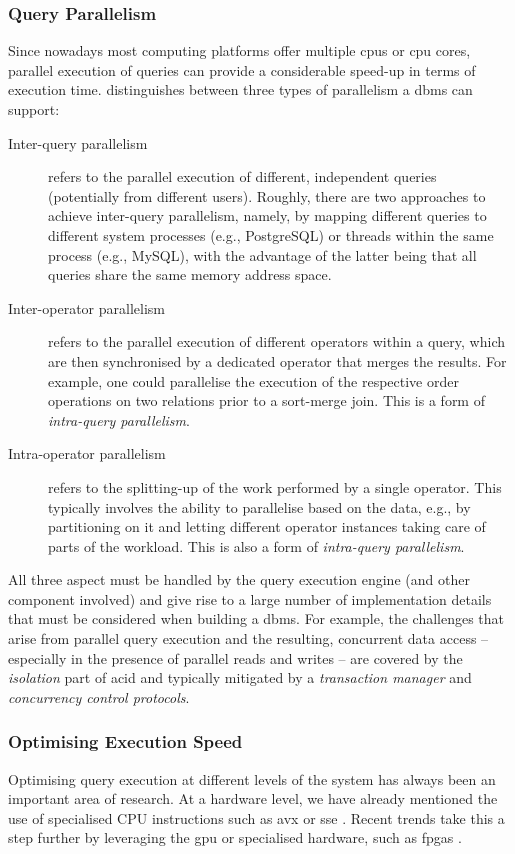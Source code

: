 \subsubsection{Query Parallelism}

Since nowadays most computing platforms offer multiple \acrshort{cpu}s or \acrshort{cpu} cores, parallel execution of queries can provide a considerable speed-up in terms of execution time. \cite{Graefe:1993Query} distinguishes between three types of parallelism a \acrshort{dbms} can support:

\begin{description}
    \item[Inter-query parallelism] refers to the parallel execution of different, independent queries (potentially from different users). Roughly, there are two approaches to achieve inter-query parallelism, namely, by mapping different queries to different system processes (e.g., PostgreSQL) or threads within the same process (e.g., MySQL), with the advantage of the latter being that all queries share the same memory address space.
    \item[Inter-operator parallelism] refers to the parallel execution of different operators within a query, which are then synchronised by a dedicated operator that merges the results. For example, one could parallelise the execution of the respective order operations on two relations prior to a sort-merge join. This is a form of \emph{intra-query parallelism}.
    \item[Intra-operator parallelism] refers to the splitting-up of the work performed by a single operator. This typically involves the ability to parallelise based on the data, e.g., by partitioning on it and letting different operator instances taking care of parts of the workload. This is also a form of \emph{intra-query parallelism}.
\end{description}

All three aspect must be handled by the query execution engine (and other component involved) and give rise to a large number of implementation details that must be considered when building a \acrshort{dbms}. For example, the challenges that arise from parallel query execution and the resulting, concurrent data access -- especially in the presence of parallel reads and writes -- are covered by the \emph{isolation} part of \acrshort{acid} and typically mitigated by a \emph{transaction manager} and \emph{concurrency control protocols}.

\subsubsection{Optimising Execution Speed}
Optimising query execution at different levels of the system has always been an important area of research. At a hardware level, we have already mentioned the use of specialised CPU instructions such as \acrshort{avx} or \acrshort{sse} \cite{Idreos:2012MonetDB,Polychroniou:2020VIP,Polychroniou:2019Towards,Shen:2021Using}. Recent trends take this a step further by leveraging the \acrshort{gpu} or specialised hardware, such as \acrshort{fpga}s \cite{Abadi:2014Beckman,Abadi:2020Seattle,Paul:2021Database}.

